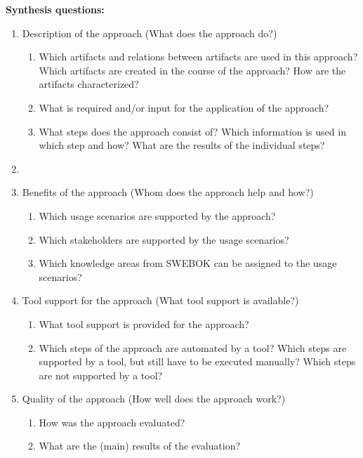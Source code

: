 \newpage
\textbf{Synthesis questions:}

\begin{enumerate}
	\item Description of the approach (What does the approach do?)
	\begin{enumerate}
		\item Which artifacts and relations between artifacts are used in this approach? Which artifacts are created in the course of the approach? How are the artifacts characterized?
		\item What is required and/or input for the application of the approach?
		\item What steps does the approach consist of? Which information is used in which step and how? What are the results of the individual steps?
	\end{enumerate}
	\item[] 
	\item Benefits of the approach (Whom does the approach help and how?)
	\begin{enumerate}
		\item Which usage scenarios are supported by the approach?
		\item Which stakeholders are supported by the usage scenarios?
		\item Which knowledge areas from SWEBOK can be assigned to the usage scenarios?
	\end{enumerate}
	\item Tool support for the approach (What tool support is available?)
	\begin{enumerate}
		\item What tool support is provided for the approach?
		\item Which steps of the approach are automated by a tool? Which steps are supported by a tool, but still have to be executed manually? Which steps are not supported by a tool?
	\end{enumerate}
	\item Quality of the approach (How well does the approach work?)
	\begin{enumerate}
		\item How was the approach evaluated?
		\item What are the (main) results of the evaluation?
	\end{enumerate}
\end{enumerate}


